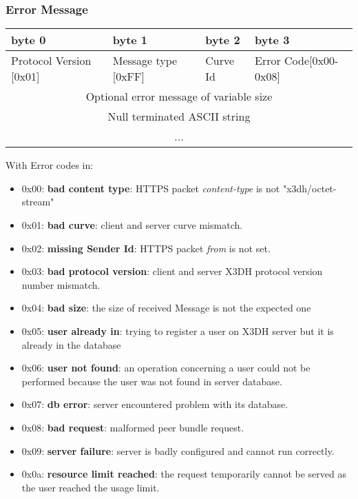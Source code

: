 \documentclass[a4paper,11pt]{article}
\begin{document}
    \subsubsection{Error Message}
      \begin{center}
      \begin{tabular}{ | p{1.4in} | p{1.4in} | p{1.4in} | p{1.4in} |}
        \hline
        \cellcolor[gray]{0.85} byte 0 & \cellcolor[gray]{0.85} byte 1 & \cellcolor[gray]{0.85} byte 2 & \cellcolor[gray]{0.85}byte 3\\
        \hline
        Protocol Version [0x01] & Message type [0xFF] & Curve Id & Error Code[0x00-0x08]\\
        \hline
        \multicolumn{4}{|c|}{Optional error message of variable size}\\
        \multicolumn{4}{|c|}{Null terminated ASCII string}\\
        \multicolumn{4}{|c|}{...}\\
        \hline
      \end{tabular}
      \end{center}

    With Error codes in:
    \begin{itemize}
      \item 0x00: \textbf{bad content type}: HTTPS packet \textit{content-type} is not "x3dh/octet-stream"
      \item 0x01: \textbf{bad curve}: client and server curve mismatch.
      \item 0x02: \textbf{missing Sender Id}: HTTPS packet \textit{from} is not set.
      \item 0x03: \textbf{bad protocol version}: client and server X3DH protocol version number mismatch.
      \item 0x04: \textbf{bad size}: the size of received Message is not the expected one
      \item 0x05: \textbf{user already in}: trying to register a user on X3DH server but it is already in the database
      \item 0x06: \textbf{user not found}: an operation concerning a user could not be performed because the user was not found in server database.
      \item 0x07: \textbf{db error}: server encountered problem with its database.
      \item 0x08: \textbf{bad request}: malformed peer bundle request.
      \item 0x09: \textbf{server failure}: server is badly configured and cannot run correctly.
      \item 0x0a: \textbf{resource limit reached}: the request temporarily cannot be served as the user reached the usage limit.
    \end{itemize}
\end{document}
